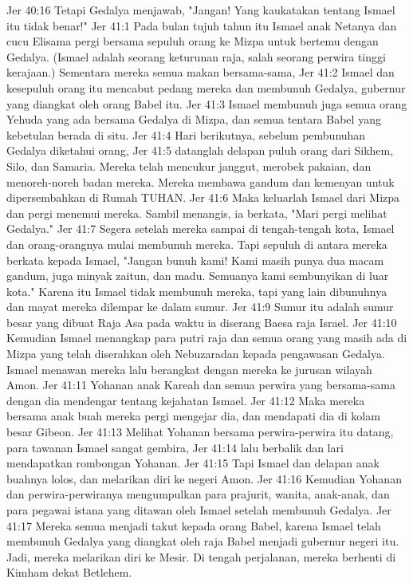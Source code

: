 Jer 40:16  Tetapi Gedalya menjawab, "Jangan! Yang kaukatakan tentang Ismael itu tidak benar!"
Jer 41:1  Pada bulan tujuh tahun itu Ismael anak Netanya dan cucu Elisama pergi bersama sepuluh orang ke Mizpa untuk bertemu dengan Gedalya. (Ismael adalah seorang keturunan raja, salah seorang perwira tinggi kerajaan.) Sementara mereka semua makan bersama-sama,
Jer 41:2  Ismael dan kesepuluh orang itu mencabut pedang mereka dan membunuh Gedalya, gubernur yang diangkat oleh orang Babel itu.
Jer 41:3  Ismael membunuh juga semua orang Yehuda yang ada bersama Gedalya di Mizpa, dan semua tentara Babel yang kebetulan berada di situ.
Jer 41:4  Hari berikutnya, sebelum pembunuhan Gedalya diketahui orang,
Jer 41:5  datanglah delapan puluh orang dari Sikhem, Silo, dan Samaria. Mereka telah mencukur janggut, merobek pakaian, dan menoreh-noreh badan mereka. Mereka membawa gandum dan kemenyan untuk dipersembahkan di Rumah TUHAN.
Jer 41:6  Maka keluarlah Ismael dari Mizpa dan pergi menemui mereka. Sambil menangis, ia berkata, "Mari pergi melihat Gedalya."
Jer 41:7  Segera setelah mereka sampai di tengah-tengah kota, Ismael dan orang-orangnya mulai membunuh mereka. Tapi sepuluh di antara mereka berkata kepada Ismael, "Jangan bunuh kami! Kami masih punya dua macam gandum, juga minyak zaitun, dan madu. Semuanya kami sembunyikan di luar kota." Karena itu Ismael tidak membunuh mereka, tapi yang lain dibunuhnya dan mayat mereka dilempar ke dalam sumur.
Jer 41:9  Sumur itu adalah sumur besar yang dibuat Raja Asa pada waktu ia diserang Baesa raja Israel.
Jer 41:10  Kemudian Ismael menangkap para putri raja dan semua orang yang masih ada di Mizpa yang telah diserahkan oleh Nebuzaradan kepada pengawasan Gedalya. Ismael menawan mereka lalu berangkat dengan mereka ke jurusan wilayah Amon.
Jer 41:11  Yohanan anak Kareah dan semua perwira yang bersama-sama dengan dia mendengar tentang kejahatan Ismael.
Jer 41:12  Maka mereka bersama anak buah mereka pergi mengejar dia, dan mendapati dia di kolam besar Gibeon.
Jer 41:13  Melihat Yohanan bersama perwira-perwira itu datang, para tawanan Ismael sangat gembira,
Jer 41:14  lalu berbalik dan lari mendapatkan rombongan Yohanan.
Jer 41:15  Tapi Ismael dan delapan anak buahnya lolos, dan melarikan diri ke negeri Amon.
Jer 41:16  Kemudian Yohanan dan perwira-perwiranya mengumpulkan para prajurit, wanita, anak-anak, dan para pegawai istana yang ditawan oleh Ismael setelah membunuh Gedalya.
Jer 41:17  Mereka semua menjadi takut kepada orang Babel, karena Ismael telah membunuh Gedalya yang diangkat oleh raja Babel menjadi gubernur negeri itu. Jadi, mereka melarikan diri ke Mesir. Di tengah perjalanan, mereka berhenti di Kimham dekat Betlehem.
